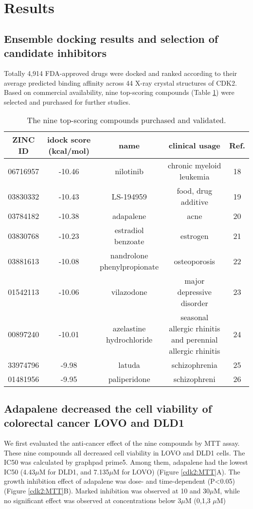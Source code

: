 \section{Results}

\subsection{Ensemble docking results and selection of candidate inhibitors}

Totally 4,914 FDA-approved drugs were docked and ranked according to their average predicted binding affinity across 44 X-ray crystal structures of CDK2. Based on commercial availability, nine top-scoring compounds (Table \ref{cdk2:Top9}) were selected and purchased for further studies.

\begin{table}
\caption{The nine top-scoring compounds purchased and validated.}
\label{cdk2:Top9}
\begin{tabular}{ccccc}
\hline
ZINC ID & idock score (kcal/mol) & name & clinical usage & Ref.\\
\hline
06716957 & -10.46 & nilotinib & chronic myeloid leukemia & 18\\
03830332 & -10.43 & LS-194959 & food, drug additive & 19\\
03784182 & -10.38 & adapalene & acne & 20\\
03830768 & -10.23 & estradiol benzoate & estrogen & 21\\
03881613 & -10.08 & nandrolone phenylpropionate & osteoporosis & 22\\
01542113 & -10.06 & vilazodone & major depressive disorder & 23\\
00897240 & -10.01 & azelastine hydrochloride & seasonal allergic rhinitis and perennial allergic rhinitis & 24\\
33974796 &  -9.98 & latuda & schizophrenia & 25\\
01481956 &  -9.95 & paliperidone & schizophreni & 26\\
\hline
\end{tabular}
\end{table}

\subsection{Adapalene decreased the cell viability of colorectal cancer LOVO and DLD1}

We first evaluated the anti-cancer effect of the nine compounds by MTT assay. These nine compounds all decreased cell viability in LOVO and DLD1 cells. The IC50 was calculated by graphpad prime5. Among them, adapalene had the lowest IC50 (4.43$\mu$M for DLD1, and 7.135$\mu$M for LOVO) (Figure \ref{cdk2:MTT}A). The growth inhibition effect of adapalene was dose- and time-dependent (P<0.05) (Figure \ref{cdk2:MTT}B). Marked inhibition was observed at 10 and 30$\mu$M, while no significant effect was observed at concentrations below 3$\mu$M (0,1,3 $\mu$M)

